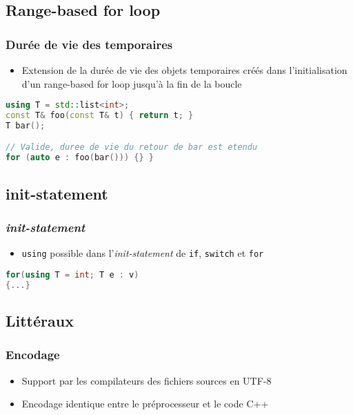 \documentclass[C++.tex]{subfiles}
\begin{document}
\subsection*{Range-based for loop}
\begin{frame}[fragile]
	\frametitle{Durée de vie des temporaires}
	\begin{itemize}
		\item Extension de la durée de vie des objets temporaires créés dans l'initialisation d'un range-based for loop jusqu'à la fin de la boucle
	\end{itemize}

	\begin{lstlisting}[language=C++]
using T = std::list<int>;
const T& foo(const T& t) { return t; }
T bar();

// Valide, duree de vie du retour de bar est etendu
for (auto e : foo(bar())) {} }\end{lstlisting}
\end{frame}

\subsection*{init-statement}
\begin{frame}[fragile]
	\frametitle{\textit{init-statement}}
	\begin{itemize}
		\item \lstinline|using| possible dans l'\textit{init-statement} de \lstinline|if|, \lstinline|switch| et \lstinline|for|
	\end{itemize}

	\begin{lstlisting}[language=C++]
for(using T = int; T e : v)
{...}\end{lstlisting}


\end{frame}

\subsection*{Littéraux}
\begin{frame}[fragile]
	\frametitle{Encodage}
	\begin{itemize}
		\item Support par les compilateurs des fichiers sources en UTF-8


		\item Encodage identique entre le préprocesseur et le code C++


	\end{itemize}
\end{frame}
\end{document}
